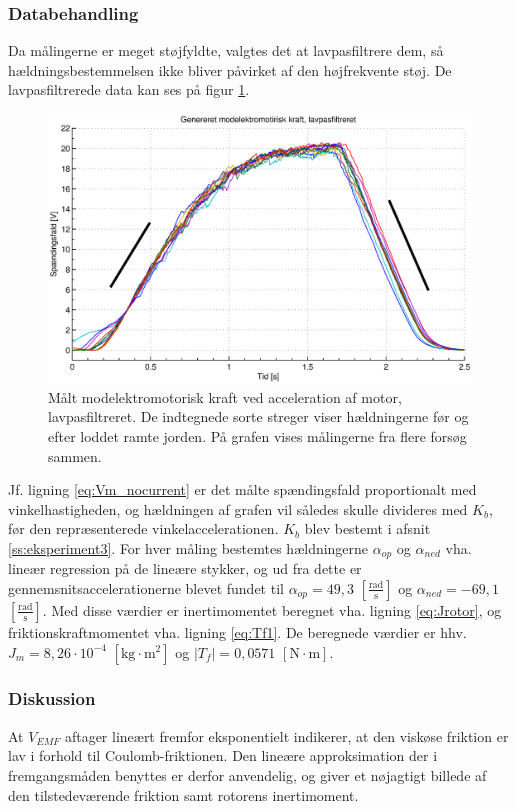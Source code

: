\subsubsection{Databehandling}
Da målingerne er meget støjfyldte, valgtes det at lavpasfiltrere dem, så hældningsbestemmelsen
ikke bliver påvirket af den højfrekvente støj.
De lavpasfiltrerede data kan ses på figur \ref{fig:vemf1}.
\begin{figure}[th!]
	\centering
	\includegraphics[width=1\textwidth]{./graphics/vemf1.eps}
	\caption[Målt modelektromotorisk kraft ved acceleration af motor, lavpasfiltreret]
		{Målt modelektromotorisk kraft ved acceleration af motor, lavpasfiltreret.
		De indtegnede sorte streger viser hældningerne før og efter loddet ramte jorden.
		På grafen vises målingerne fra flere forsøg sammen.}
	\label{fig:vemf1}
\end{figure}
Jf. ligning \ref{eq:Vm_nocurrent} er det målte spændingsfald proportionalt med
vinkelhastigheden, og hældningen af grafen vil således skulle divideres med \(K_b\),
før den repræsenterede vinkelaccelerationen. \(K_b\) blev bestemt i afsnit \ref{ss:eksperiment3}.
For hver måling bestemtes hældningerne \(\alpha_{op}\) og \(\alpha_{ned}\) vha. lineær regression på de lineære stykker,
og ud fra dette er gennemsnitsaccelerationerne blevet fundet til
\(\alpha_{op}=49,3\) \([\frac{\text{rad}}{\text{s}}]\) og \(\alpha_{ned}=-69,1\) \([\frac{\text{rad}}{\text{s}}]\).
Med disse værdier er inertimomentet beregnet vha. ligning \ref{eq:Jrotor}, og friktionskraftmomentet vha. ligning \ref{eq:Tf1}.
De beregnede værdier er hhv. \(J_m=8,26\cdot10^{-4}\) \([\text{kg}\cdot{\text{m}^2}]\) og \(\left| { T }_{ f } \right| =0,0571\) \( [\text{N} \cdot \text{m}]\).
\subsubsection{Diskussion}
At \(V_{EMF}\) aftager lineært fremfor eksponentielt indikerer,
at den viskøse friktion er lav i forhold til Coulomb-friktionen.
Den lineære approksimation der i fremgangsmåden benyttes er derfor anvendelig,
og giver et nøjagtigt billede af den tilstedeværende friktion samt rotorens inertimoment.
